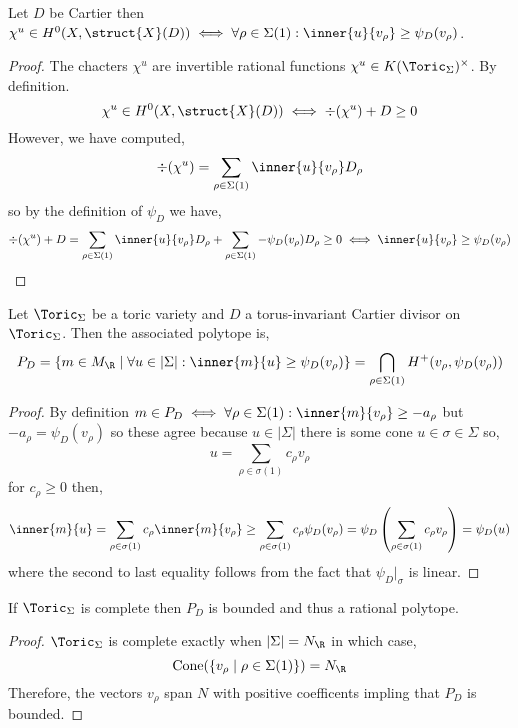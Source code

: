 \begin{lemma}
Let $D$ be Cartier then
$\chi^u \in H^0(X, \struct{X}(D)) \iff \forall \rho \in \Sigma(1) : \inner{u}{v_\rho} \ge \psi_D(v_\rho)$.
\end{lemma}

\begin{proof}
The chacters $\chi^u$ are invertible rational functions $\chi^u \in K(\Toric_\Sigma)^\times$. By definition. 
\[ \chi^u \in H^0(X, \struct{X}(D)) \iff \div(\chi^u) + D \ge 0 \]
However, we have computed,
\[ \div{(\chi^u)} = \sum_{\rho \in \Sigma(1)} \inner{u}{v_\rho} D_\rho \]
so by the definition of $\psi_D$ we have,
\[ \div(\chi^u) + D = \sum_{\rho \in \Sigma(1)} \inner{u}{v_\rho} D_\rho  + \sum_{\rho \in \Sigma(1)} -\psi_D(v_\rho) D_\rho \ge 0 \iff \inner{u}{v_\rho} \ge \psi_D(v_\rho) \]
\end{proof}

\begin{prop}
Let $\Toric_\Sigma$ be a toric variety and $D$ a torus-invariant Cartier divisor on $\Toric_\Sigma$. Then the associated polytope is,
\[ P_D = \{ m \in M_\R \mid \forall u \in |\Sigma| : \inner{m}{u} \ge \psi_D(v_\rho) \} = \bigcap_{\rho \in \Sigma(1)} H^+(v_\rho, \psi_D(v_\rho)) \]
\end{prop}

\begin{proof}
By definition $m \in P_D \iff \forall \rho \in \Sigma(1) : \inner{m}{v_\rho} \ge - a_\rho$ but $-a_\rho = \psi_D(v_\rho)$ so these agree because $u \in |\Sigma|$ there is some cone $u \in \sigma \in \Sigma$ so,
\[ u = \sum_{\rho \in \sigma(1)} c_\rho v_\rho \]
for $c_\rho \ge 0$ then,
\[ \inner{m}{u} = \sum_{\rho \in \sigma(1)} c_\rho \inner{m}{v_\rho} \ge \sum_{\rho \in \sigma(1)} c_\rho \psi_D(v_\rho) = \psi_D \left( \sum_{\rho \in \sigma(1)} c_\rho v_\rho \right) = \psi_D(u) \]
where the second to last equality follows from the fact that $\psi_D |_\sigma$ is linear. 
\end{proof}

\begin{proposition}
If $\Toric_\Sigma$ is complete then $P_D$ is bounded and thus a rational polytope. 
\end{proposition}

\begin{proof}
$\Toric_\Sigma$ is complete exactly when $|\Sigma| = N_\R$ in which case,
\[ \mathrm{Cone}(\{ v_\rho \mid \rho \in \Sigma(1) \}) = N_\R \]
Therefore, the vectors $v_\rho$ span $N$ with positive coefficents impling that $P_D$ is bounded.
\end{proof}

